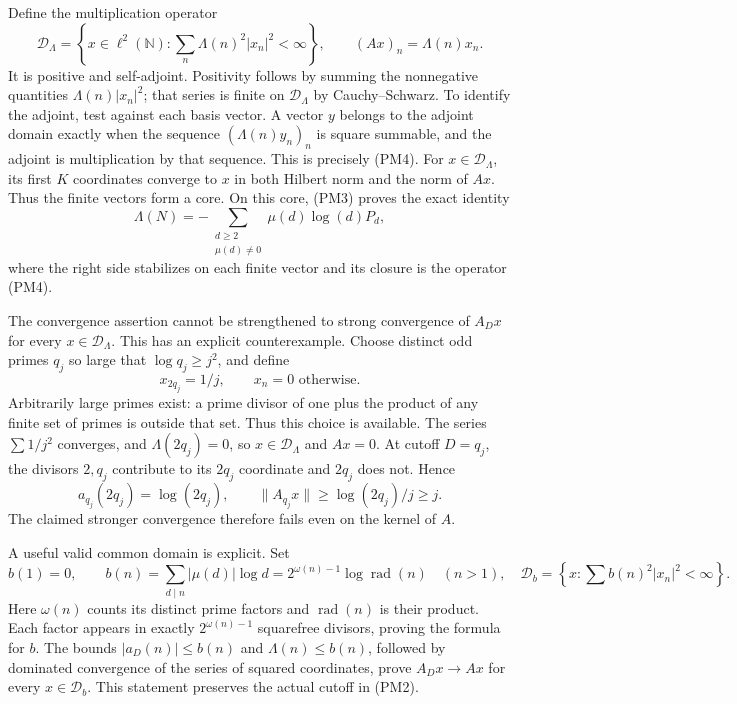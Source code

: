 \documentclass[
  10pt,
  a4paper,
]{article}
\begin{document}
Define the multiplication operator \[
\mathcal D_\Lambda=\left\{x\in\ell^2(\mathbb N):
\sum_n\Lambda(n)^2|x_n|^2<\infty\right\},\qquad
(Ax)_n=\Lambda(n)x_n.
\tag{PM4}
\] It is positive and self-adjoint. Positivity follows by summing the
nonnegative quantities \(\Lambda(n)|x_n|^2\); that series is finite on
\(\mathcal D_\Lambda\) by Cauchy--Schwarz. To identify the adjoint, test
against each basis vector. A vector \(y\) belongs to the adjoint domain
exactly when the sequence \((\Lambda(n)y_n)_n\) is square summable, and
the adjoint is multiplication by that sequence. This is precisely (PM4).
For \(x\in\mathcal D_\Lambda\), its first \(K\) coordinates converge to
\(x\) in both Hilbert norm and the norm of \(Ax\). Thus the finite
vectors form a core. On this core, (PM3) proves the exact identity \[
\boxed{\Lambda(N)=-\sum_{\substack{d\ge2\\\mu(d)\ne0}}
\mu(d)\log(d)P_d,}
\tag{PM5}
\] where the right side stabilizes on each finite vector and its closure
is the operator (PM4).

The convergence assertion cannot be strengthened to strong convergence
of \(A_Dx\) for every \(x\in\mathcal D_\Lambda\). This has an explicit
counterexample. Choose distinct odd primes \(q_j\) so large that
\(\log q_j\ge j^2\), and define \[
x_{2q_j}=1/j,\qquad x_n=0\text{ otherwise}.
\tag{PM6}
\] Arbitrarily large primes exist: a prime divisor of one plus the
product of any finite set of primes is outside that set. Thus this
choice is available. The series \(\sum1/j^2\) converges, and
\(\Lambda(2q_j)=0\), so \(x\in\mathcal D_\Lambda\) and \(Ax=0\). At
cutoff \(D=q_j\), the divisors \(2,q_j\) contribute to its \(2q_j\)
coordinate and \(2q_j\) does not. Hence \[
a_{q_j}(2q_j)=\log(2q_j),\qquad
\|A_{q_j}x\|\ge\log(2q_j)/j\ge j.
\tag{PM7}
\] The claimed stronger convergence therefore fails even on the kernel
of \(A\).

A useful valid common domain is explicit. Set \[
b(1)=0,\qquad
b(n)=\sum_{d\mid n}|\mu(d)|\log d
=2^{\omega(n)-1}\log\operatorname{rad}(n)\quad(n>1),
\quad
\mathcal D_b=\left\{x:\sum b(n)^2|x_n|^2<\infty\right\}.
\tag{PM8}
\] Here \(\omega(n)\) counts its distinct prime factors and
\(\operatorname{rad}(n)\) is their product. Each factor appears in
exactly \(2^{\omega(n)-1}\) squarefree divisors, proving the formula for
\(b\). The bounds \(|a_D(n)|\le b(n)\) and \(\Lambda(n)\le b(n)\),
followed by dominated convergence of the series of squared coordinates,
prove \(A_Dx\to Ax\) for every \(x\in\mathcal D_b\). This statement
preserves the actual cutoff in (PM2).
\end{document}
